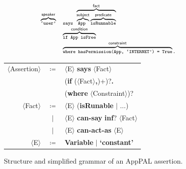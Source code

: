\documentclass[]{llncs}
\begin{document}
\begin{figure}
  \newcommand{\bracetext}[1]{\text{\sffamily #1}}
  \newcommand{\smalltext}[1]{\text{\ttfamily\scriptsize #1}}
  \centering
  \begin{minipage}{0.49\linewidth}
    \begin{equation*}\small
      \begin{array}{r l}\footnotesize
        \overbrace{\smalltext{`user'}}^{\bracetext{speaker}} &
        \smalltext{ says }\overbrace{\overbrace{\smalltext{ App }}^{\bracetext{subject}}\overbrace{\smalltext{ isRunnable}}^{\bracetext{predicate}}}^{\bracetext{fact}} \\
        & \overbrace{\smalltext{ if App isFree}}^{\bracetext{condition}} \\
        & \overbrace{\smalltext{ where hasPermission(App, `INTERNET') = True}}^{\bracetext{constraint}}.
      \end{array}
    \end{equation*}
  \end{minipage}
  \begin{minipage}{0.49\linewidth}
  \newcommand{\nonterminal}[1]{$\langle$#1$\rangle$}
  \newcommand{\terminal}[1]{\textbf{#1}}
  \begin{tabular}{r c l}
    \footnotesize
    \nonterminal{Assertion} & $\coloneqq$ & \nonterminal{E} \terminal{says} \nonterminal{Fact} \\
                            &             & \hspace{1em}(\terminal{if} (\nonterminal{Fact}\terminal{,})+)?\terminal{.} \\
                            &             & \hspace{1em}(\terminal{where} \nonterminal{Constraint})? \\
    \nonterminal{Fact}      & $\coloneqq$ & \nonterminal{E} (\terminal{isRunable} $\vert$ $\ldots$) \\
                            & $\vert$     & \nonterminal{E} \terminal{can-say} \terminal{inf}? \nonterminal{Fact} \\
                            & $\vert$     & \nonterminal{E} \terminal{can-act-as} \nonterminal{E} \\
    \nonterminal{E}         & $\coloneqq$ & \terminal{Variable} $\vert$ \terminal{`constant'}
  \end{tabular}
  \end{minipage}
  \caption{Structure and simplified grammar of an AppPAL assertion.}
  \label{fig:assertion}
\end{figure}
\end{document}
